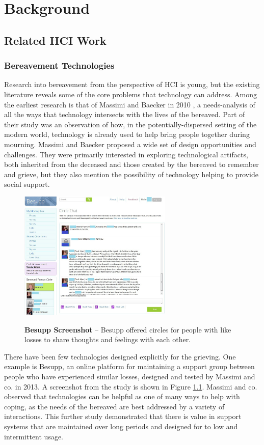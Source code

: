 \chapter{Background}
\section{Related HCI Work}
  \subsection{Bereavement Technologies}
  Research into bereavement from the perspective of HCI is young, but the
  existing literature reveals some of the core problems that technology can
  address. Among the earliest research is that of Massimi and Baecker in 2010
  \cite{mm10},
  a needs-analysis of all the ways that technology intersects with the lives of
  the bereaved.
  Part of their study was an observation of how,
  in the potentially-dispersed setting of the modern world, 
  technology is already used to help bring people together during mourning.
  Massimi and Baecker proposed a wide set of design opportunities and challenges.
  They were primarily interested in exploring technological artifacts,
  both inherited from the deceased and those created by the bereaved to
  remember and grieve, but they also mention the possibility of technology
  helping to provide social support.

  \begin{figure}
  \caption{\textbf{Besupp Screenshot} --
  Besupp offered circles for people with like losses to share thoughts
  and feelings with each other.
  }
  \centering
  \includegraphics[width=0.65\textwidth]{besupp.png}
  \label{fig:besupp}
  \end{figure}

  There have been few technologies designed explicitly for the grieving. One
  example is Besupp, an online platform for maintaining a support group between
  people who have experienced similar losses, designed and tested by Massimi and
  co. in 2013. \cite{mm13}
  A screenshot from the study is shown in Figure \ref{fig:besupp}.
  Massimi and co. observed that technologies can be helpful as
  one of many ways to help with coping, as the needs of the bereaved are best
  addressed by a variety of interactions.
  This further study demonstrated that
  there is value in support systems that are maintained over long periods and
  designed for to low and intermittent usage.

